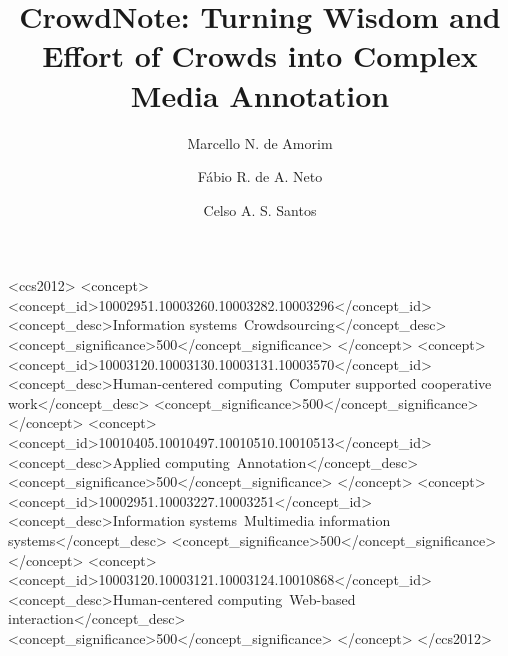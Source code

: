 \documentclass[sigconf]{acmart}
\begin{document}
\title{CrowdNote: Turning Wisdom and Effort of Crowds into Complex Media  Annotation}

\author{Marcello N. de Amorim}

\author{F\'abio R. de A. Neto}

\author{Celso A. S. Santos}


\renewcommand{\shortauthors}{Marcello N. de Amorim et. al.}


\begin{abstract}
	
\end{abstract}

\begin{CCSXML}
<ccs2012>
<concept>
<concept_id>10002951.10003260.10003282.10003296</concept_id>
<concept_desc>Information systems~Crowdsourcing</concept_desc>
<concept_significance>500</concept_significance>
</concept>
<concept>
<concept_id>10003120.10003130.10003131.10003570</concept_id>
<concept_desc>Human-centered computing~Computer supported cooperative work</concept_desc>
<concept_significance>500</concept_significance>
</concept>
<concept>
<concept_id>10010405.10010497.10010510.10010513</concept_id>
<concept_desc>Applied computing~Annotation</concept_desc>
<concept_significance>500</concept_significance>
</concept>
<concept>
<concept_id>10002951.10003227.10003251</concept_id>
<concept_desc>Information systems~Multimedia information systems</concept_desc>
<concept_significance>500</concept_significance>
</concept>
<concept>
<concept_id>10003120.10003121.10003124.10010868</concept_id>
<concept_desc>Human-centered computing~Web-based interaction</concept_desc>
<concept_significance>500</concept_significance>
</concept>
</ccs2012>
\end{CCSXML}



\end{document}
